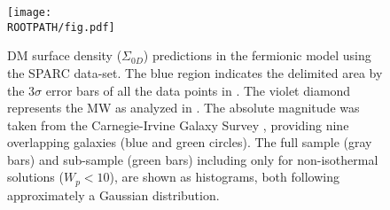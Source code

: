 \begin{figure}%
	\centering%
	\texttt{[image: \\ROOTPATH/fig.pdf]}
	\caption{DM surface density ($\Sigma_{0D}$) predictions in the fermionic model using the SPARC data-set. The blue region indicates the delimited area by the $3\sigma$ error bars of all the data points in \citet{2009MNRAS.397.1169D}. The violet diamond represents the MW as analyzed in \cite{2018PDU....21...82A}. The absolute magnitude was taken from the Carnegie-Irvine Galaxy Survey \citep{2011ApJS..197...21H}, providing nine overlapping galaxies (blue and green circles). The full  sample (gray bars) and sub-sample (green bars) including only for non-isothermal solutions ($W_p < 10$), are shown as histograms, both following approximately a Gaussian distribution.}%
	\label{fig:SPARC:Donato}%
\end{figure}